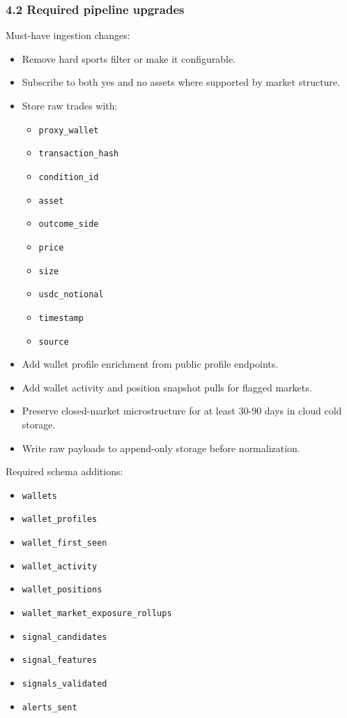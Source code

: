 \documentclass[
]{article}
\providecommand{\tightlist}{%
  \setlength{\itemsep}{0pt}\setlength{\parskip}{0pt}}
\begin{document}
\subsubsection{4.2 Required pipeline
upgrades}\label{42-required-pipeline-upgrades}

Must-have ingestion changes:

\begin{itemize}
\tightlist
\item
  Remove hard sports filter or make it configurable.
\item
  Subscribe to both yes and no assets where supported by market
  structure.
\item
  Store raw trades with:

  \begin{itemize}
  \tightlist
  \item
    \texttt{proxy\_wallet}
  \item
    \texttt{transaction\_hash}
  \item
    \texttt{condition\_id}
  \item
    \texttt{asset}
  \item
    \texttt{outcome\_side}
  \item
    \texttt{price}
  \item
    \texttt{size}
  \item
    \texttt{usdc\_notional}
  \item
    \texttt{timestamp}
  \item
    \texttt{source}
  \end{itemize}
\item
  Add wallet profile enrichment from public profile endpoints.
\item
  Add wallet activity and position snapshot pulls for flagged markets.
\item
  Preserve closed-market microstructure for at least 30-90 days in cloud
  cold storage.
\item
  Write raw payloads to append-only storage before normalization.
\end{itemize}

Required schema additions:

\begin{itemize}
\tightlist
\item
  \texttt{wallets}
\item
  \texttt{wallet\_profiles}
\item
  \texttt{wallet\_first\_seen}
\item
  \texttt{wallet\_activity}
\item
  \texttt{wallet\_positions}
\item
  \texttt{wallet\_market\_exposure\_rollups}
\item
  \texttt{signal\_candidates}
\item
  \texttt{signal\_features}
\item
  \texttt{signals\_validated}
\item
  \texttt{alerts\_sent}
\end{itemize}
\end{document}
